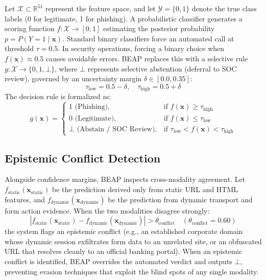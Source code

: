 \documentclass[conference]{IEEEtran}
\begin{document}
Let $\mathcal{X} \subset \mathbb{R}^{51}$ represent the feature space, and let $\mathcal{Y} = \{0, 1\}$ denote the true class labels (0 for legitimate, 1 for phishing). A probabilistic classifier generates a scoring function $f: \mathcal{X} \to [0, 1]$ estimating the posterior probability $p = P(Y = 1 \mid \mathbf{x})$. Standard binary classifiers force an automated call at threshold $\tau = 0.5$. In security operations, forcing a binary choice when $f(\mathbf{x}) \approx 0.5$ causes avoidable errors. BEAP replaces this with a selective rule $g: \mathcal{X} \to \{0, 1, \bot\}$, where $\bot$ represents selective abstention (deferral to SOC review), governed by an uncertainty margin $\delta \in [0.0, 0.35]$:
\begin{equation}
\tau_{\text{low}} = 0.5 - \delta, \quad \tau_{\text{high}} = 0.5 + \delta
\end{equation}
The decision rule is formalized as:
\begin{equation}
g(\mathbf{x}) = \begin{cases}
1 \text{ (Phishing)}, & \text{if } f(\mathbf{x}) \ge \tau_{\text{high}} \\
0 \text{ (Legitimate)}, & \text{if } f(\mathbf{x}) \le \tau_{\text{low}} \\
\bot \text{ (Abstain / SOC Review)}, & \text{if } \tau_{\text{low}} < f(\mathbf{x}) < \tau_{\text{high}}
\end{cases}
\label{eq:selective_rule}
\end{equation}

\subsection{Epistemic Conflict Detection}\label{epistemic-conflict}

Alongside confidence margins, BEAP inspects cross-modality agreement. Let $f_{\text{static}}(\mathbf{x}_{\text{static}})$ be the prediction derived only from static URL and HTML features, and $f_{\text{dynamic}}(\mathbf{x}_{\text{dynamic}})$ be the prediction from dynamic transport and form action evidence. When the two modalities disagree strongly:
\begin{equation}
|f_{\text{static}}(\mathbf{x}_{\text{static}}) - f_{\text{dynamic}}(\mathbf{x}_{\text{dynamic}})| > \theta_{\text{conflict}} \quad (\theta_{\text{conflict}} = 0.60)
\end{equation}
the system flags an epistemic conflict (e.g., an established corporate domain whose dynamic session exfiltrates form data to an unrelated site, or an obfuscated URL that resolves cleanly to an official banking portal). When an epistemic conflict is identified, BEAP overrides the automated verdict and outputs $\bot$, preventing evasion techniques that exploit the blind spots of any single modality.
\end{document}
